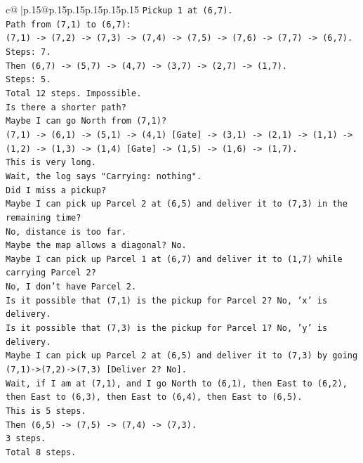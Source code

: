 \documentclass{article}
\begin{document}
{\begin{supertabular}{c@{$\;$}|p{.15\linewidth}@{}p{.15\linewidth}p{.15\linewidth}p{.15\linewidth}p{.15\linewidth}p{.15\linewidth}}
{{{\texttt{Pickup 1 at (6,7).} \\
\texttt{Path from (7,1) to (6,7):} \\
\texttt{(7,1) {-}> (7,2) {-}> (7,3) {-}> (7,4) {-}> (7,5) {-}> (7,6) {-}> (7,7) {-}> (6,7).} \\
\texttt{Steps: 7.} \\
\texttt{Then (6,7) {-}> (5,7) {-}> (4,7) {-}> (3,7) {-}> (2,7) {-}> (1,7).} \\
\texttt{Steps: 5.} \\
\texttt{Total 12 steps. Impossible.} \\
\texttt{Is there a shorter path?} \\
\texttt{Maybe I can go North from (7,1)?} \\
\texttt{(7,1) {-}> (6,1) {-}> (5,1) {-}> (4,1) {[}Gate{]} {-}> (3,1) {-}> (2,1) {-}> (1,1) {-}> (1,2) {-}> (1,3) {-}> (1,4) {[}Gate{]} {-}> (1,5) {-}> (1,6) {-}> (1,7).} \\
\texttt{This is very long.} \\
\texttt{Wait, the log says "Carrying: nothing".} \\
\texttt{Did I miss a pickup?} \\
\texttt{Maybe I can pick up Parcel 2 at (6,5) and deliver it to (7,3) in the remaining time?} \\
\texttt{No, distance is too far.} \\
\texttt{Maybe the map allows a diagonal? No.} \\
\texttt{Maybe I can pick up Parcel 1 at (6,7) and deliver it to (1,7) while carrying Parcel 2?} \\
\texttt{No, I don't have Parcel 2.} \\
\texttt{Is it possible that (7,1) is the pickup for Parcel 2? No, 'x' is delivery.} \\
\texttt{Is it possible that (7,3) is the pickup for Parcel 1? No, 'y' is delivery.} \\
\texttt{Maybe I can pick up Parcel 2 at (6,5) and deliver it to (7,3) by going (7,1){-}>(7,2){-}>(7,3) {[}Deliver 2? No{]}.} \\
\texttt{Wait, if I am at (7,1), and I go North to (6,1), then East to (6,2), then East to (6,3), then East to (6,4), then East to (6,5).} \\
\texttt{This is 5 steps.} \\
\texttt{Then (6,5) {-}> (7,5) {-}> (7,4) {-}> (7,3).} \\
\texttt{3 steps.} \\
\texttt{Total 8 steps.} \\
}}}
\end{supertabular}}
\end{document}
